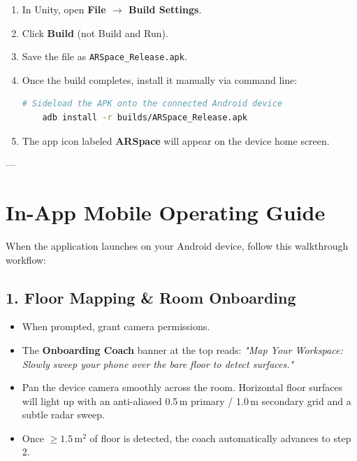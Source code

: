 \documentclass[11pt,a4paper]{article}
\begin{document}
\begin{enumerate}
    \item In Unity, open \textbf{File $\rightarrow$ Build Settings}.
    \item Click \textbf{Build} (not Build and Run).
    \item Save the file as \texttt{ARSpace\_Release.apk}.
    \item Once the build completes, install it manually via command line:
    \begin{lstlisting}[language=bash]
    # Sideload the APK onto the connected Android device
    adb install -r builds/ARSpace_Release.apk
    \end{lstlisting}
    \item The app icon labeled \textbf{ARSpace} will appear on the device home screen.
\end{enumerate}

---

\section{In-App Mobile Operating Guide}

When the application launches on your Android device, follow this walkthrough workflow:

\subsection{1. Floor Mapping \& Room Onboarding}
\begin{itemize}
    \item When prompted, grant camera permissions.
    \item The \textbf{Onboarding Coach} banner at the top reads: \textit{"Map Your Workspace: Slowly sweep your phone over the bare floor to detect surfaces."}
    \item Pan the device camera smoothly across the room. Horizontal floor surfaces will light up with an anti-aliased 0.5\,m primary / 1.0\,m secondary grid and a subtle radar sweep.
    \item Once $\ge 1.5\,\text{m}^2$ of floor is detected, the coach automatically advances to step 2.
\end{itemize}
\end{document}
